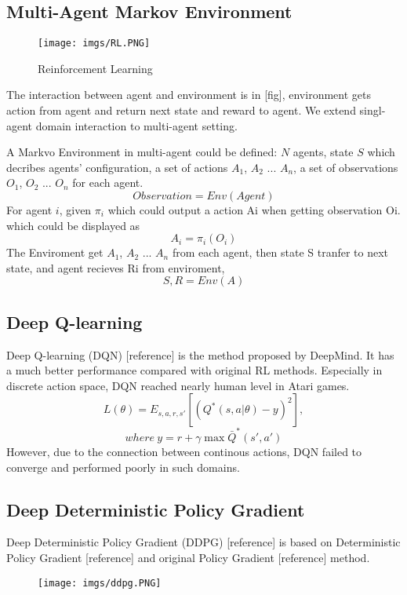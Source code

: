 \documentclass[11pt,twocolumn]{jarticle} %
\begin{document}
\subsection{Multi-Agent Markov Environment}

\begin{figure}[h]
 \begin{center}
  \texttt{[image: imgs/RL.PNG]}
  \caption{Reinforcement Learning}
  \label{fig:rl}
 \end{center}
\end{figure}

The interaction between agent and environment is in [fig], environment gets action from agent and return next state and reward to agent.
We extend singl-agent domain interaction to multi-agent setting. \par
A Markvo Environment in multi-agent could be defined: $N$ agents, 
state $S$ which decribes agents' configuration, 
a set of actions $A_1$, $A_2$ ... $A_n$,
a set of observations $O_1$, $O_2$ ... $O_n$ for each agent.
\[ Observation = Env (Agent) \]
For agent $i$, given $\pi_i$ which could output a action Ai when getting observation Oi. which could be displayed as 
\[ A_i = \pi_i (O_i) \]
The Enviroment get $A_1$, $A_2$ ... $A_n$ from each agent, 
then state S tranfer to next state, and agent recieves Ri from enviroment,
\[ S, R = Env (A) \]
\subsection{Deep Q-learning}
Deep Q-learning (DQN) [reference] is the method proposed by DeepMind. It has a much better performance compared with original RL methods. Especially in discrete action space, DQN reached nearly human level in Atari games.
\begin{equation}
L(\theta) = E_{s,a,r,s'}[(Q^*(s, a|\theta) - y)^2],  
\end{equation}
$$where\ y = r + \gamma\max \bar{Q}^*(s', a')$$
However, due to the connection between continous actions, DQN failed to converge and performed poorly in such domains.
\subsection{Deep Deterministic Policy Gradient}
Deep Deterministic Policy Gradient (DDPG) [reference] is based on Deterministic Policy Gradient [reference] and original Policy Gradient [reference] method. 

\begin{figure}[h]
 \begin{center}
  \texttt{[image: imgs/ddpg.PNG]}
  \label{fig:ddpg}
 \end{center}
\end{figure}
\end{document}
